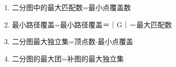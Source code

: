 \begin{enumerate}
\item 二分图中的最大匹配数=最小点覆盖数
\item 最小路径覆盖=最小路径覆盖＝｜G｜－最大匹配数
\item 二分图最大独立集=顶点数-最小点覆盖
\item 二分图的最大团=补图的最大独立集
\end{enumerate}